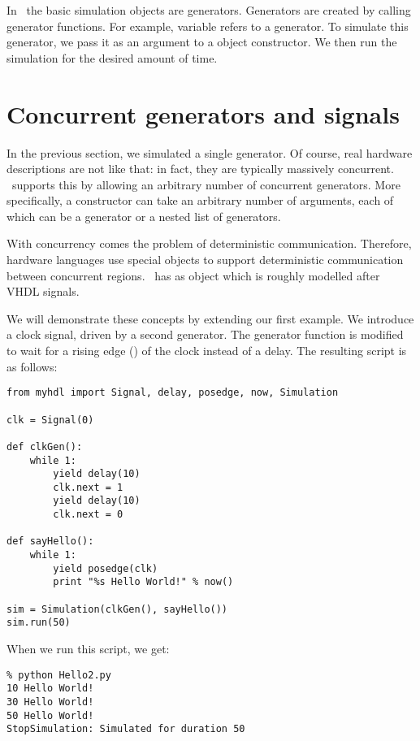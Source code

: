 In \myhdl\, the basic simulation objects are generators. Generators
are created by calling generator functions. For example, variable
 refers to a generator. To simulate this generator, we pass
it as an argument to a  object constructor.  We then
run the simulation for the desired amount of time.


\section{Concurrent generators and signals}

In the previous section, we simulated a single generator. Of course,
real hardware descriptions are not like that: in fact, they are
typically massively concurrent. \myhdl\ supports this by allowing an
arbitrary number of concurrent generators. More specifically, a
 constructor can take an arbitrary number of
arguments, each of which can be a generator or a nested list of
generators.

With concurrency comes the problem of deterministic
communication. Therefore, hardware languages use special objects to
support deterministic communication between concurrent
regions. \myhdl\ has as  object which is roughly modelled
after VHDL signals.

We will demonstrate these concepts by extending our first example. We
introduce a clock signal, driven by a second generator. The
 generator function is modified to wait for a rising
edge () of the clock instead of a delay. The resulting
script is as follows:

\begin{verbatim}
from myhdl import Signal, delay, posedge, now, Simulation

clk = Signal(0)

def clkGen():
    while 1:
        yield delay(10)
        clk.next = 1
        yield delay(10)
        clk.next = 0

def sayHello():
    while 1:
        yield posedge(clk)
        print "%s Hello World!" % now()

sim = Simulation(clkGen(), sayHello())
sim.run(50)

\end{verbatim}

When we run this script, we get:

\begin{verbatim}
% python Hello2.py
10 Hello World!
30 Hello World!
50 Hello World!
StopSimulation: Simulated for duration 50

\end{verbatim}

